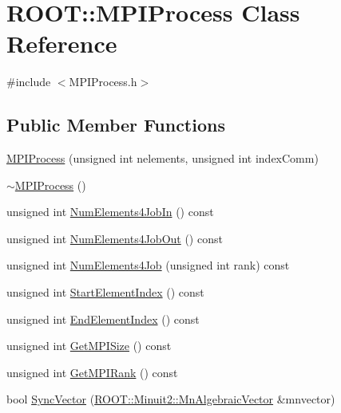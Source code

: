 \hypertarget{classROOT_1_1Minuit2_1_1MPIProcess}{}\section{R\+O\+OT\+:\+:M\+P\+I\+Process Class Reference}
\label{classROOT_1_1Minuit2_1_1MPIProcess}


{\ttfamily \#include $<$M\+P\+I\+Process.\+h$>$}

\subsection*{Public Member Functions}
\begin{DoxyCompactItemize}
\item 
\mbox{\hyperlink{classROOT_1_1Minuit2_1_1MPIProcess_a43d72185b19c2e99f914ff408fd2755b}{M\+P\+I\+Process}} (unsigned int nelements, unsigned int index\+Comm)
\item 
\mbox{\hyperlink{classROOT_1_1Minuit2_1_1MPIProcess_ac2be6e4b9a721d7f1bf9512580bc113b}{$\sim$\+M\+P\+I\+Process}} ()
\item 
unsigned int \mbox{\hyperlink{classROOT_1_1Minuit2_1_1MPIProcess_ada3f8f6f1b28844db6cb6bd717521ffd}{Num\+Elements4\+Job\+In}} () const
\item 
unsigned int \mbox{\hyperlink{classROOT_1_1Minuit2_1_1MPIProcess_a8ab54fbeb2dd760265e0121573361c3f}{Num\+Elements4\+Job\+Out}} () const
\item 
unsigned int \mbox{\hyperlink{classROOT_1_1Minuit2_1_1MPIProcess_a9d9453545f311f9f9f995800ed518258}{Num\+Elements4\+Job}} (unsigned int rank) const
\item 
unsigned int \mbox{\hyperlink{classROOT_1_1Minuit2_1_1MPIProcess_a9e6b2dc6f57cc91bb11637b50ba15957}{Start\+Element\+Index}} () const
\item 
unsigned int \mbox{\hyperlink{classROOT_1_1Minuit2_1_1MPIProcess_af4445148831dec4961d5f8aa99aeb2c1}{End\+Element\+Index}} () const
\item 
unsigned int \mbox{\hyperlink{classROOT_1_1Minuit2_1_1MPIProcess_a9bd9f26ca9de3967741e014fcab5bb59}{Get\+M\+P\+I\+Size}} () const
\item 
unsigned int \mbox{\hyperlink{classROOT_1_1Minuit2_1_1MPIProcess_a86c50a55e3ae2651b74fa18443a13dd3}{Get\+M\+P\+I\+Rank}} () const
\item 
bool \mbox{\hyperlink{classROOT_1_1Minuit2_1_1MPIProcess_a179f3ea817399a73cbce05d1778ec128}{Sync\+Vector}} (\mbox{\hyperlink{namespaceROOT_1_1Minuit2_a62ed97730a1ca8d3fbaec64a19aa11c9}{R\+O\+O\+T\+::\+Minuit2\+::\+Mn\+Algebraic\+Vector}} \&mnvector)

\end{DoxyCompactItemize}
